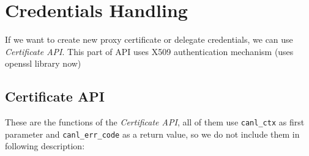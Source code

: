 %
%

\section{Credentials Handling}
\label{s:cs-auth-conn}

If we want to create new proxy certificate or \Eg delegate
credentials, we can use \CANL \textit{Certificate API}.
This part of API uses X509 authentication mechanism 
(uses openssl library now)

\subsection{Certificate API}
These are the functions of the \textit{Certificate API}, all of them use
{\tt canl\_ctx} as first parameter and {\tt canl\_err\_code} as a return
value, so we do not include them in following description:


